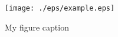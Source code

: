 \begin{figure}[h]
	\texttt{[image: ./eps/example.eps]}
    \caption{My figure caption}
    \label{fig:example}
\end{figure}

